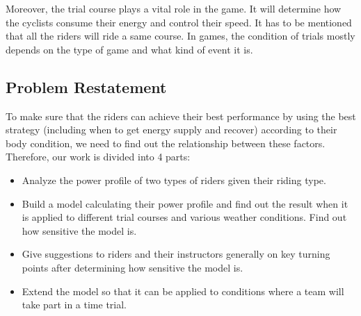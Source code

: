 \documentclass[14pt]{article}
\theoremstyle{definition}
\theoremstyle{remark}
\numberwithin{equation}{section}
\begin{document}
	Moreover, the trial course plays a vital role in the game. It will determine how the cyclists consume their energy and control their speed. It has to be mentioned that all the riders will ride a same course. In games, the condition of trials mostly depends on the type of game and what kind of event it is.
	\subsection{Problem Restatement}
	To make sure that the riders can achieve their best performance by using the best strategy (including when to get energy supply and recover) according  to their body condition, we need to find out the relationship between these factors. Therefore, our work is divided into 4 parts:
	\begin{itemize}
		\item  Analyze the power profile of two types of riders given their riding type.
		\item  Build a model calculating their power profile and find out the result when it is applied to different trial courses and various weather conditions. Find out how sensitive the model is.
		\item  Give suggestions to riders and their instructors generally on key turning points after determining how sensitive the model is.
		\item  Extend the model so that it can be applied to conditions where a team will take part in a time trial.
	\end{itemize}
\end{document}
